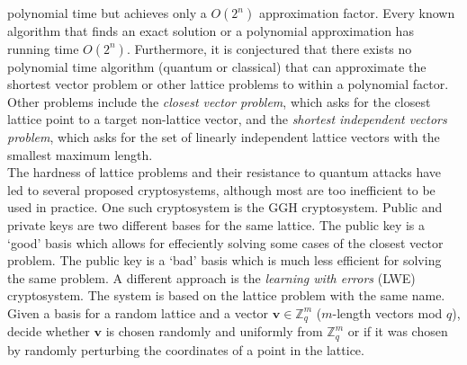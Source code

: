 \documentclass{article}
\renewcommand{\v}{\mathbf}
\begin{document}
polynomial time but achieves only a $O(2^n)$ approximation factor.
Every known algorithm that finds an exact solution or a polynomial approximation has running time $O(2^n)$. 
Furthermore, it is conjectured that there exists no polynomial time algorithm (quantum or classical) that can approximate the shortest vector problem
or other lattice problems to within a polynomial factor.
Other problems include the \textit{closest vector problem}, which asks for the closest lattice point to a target non-lattice vector,
and the \textit{shortest independent vectors problem}, which asks for the set of linearly independent lattice vectors with the smallest
maximum length.\footnotemark[\value{footnote}]\\

The hardness of lattice problems and their resistance to quantum attacks have led to several proposed cryptosystems, although most are
too inefficient to be used in practice. 
One such cryptosystem is the GGH cryptosystem. Public and private keys are two
different bases for the same lattice. The public key is a `good'
basis which allows for effeciently solving some cases
of the closest vector problem. The public key is a `bad' basis which
is much less efficient for solving the same problem. 
A different approach is the \textit{learning with errors} (LWE) cryptosystem.
The system is based on the lattice problem with the same name. 
Given a basis for a random lattice and a vector $\v{v} \in \mathbb{Z}^m_q$ ($m$-length vectors mod $q$), decide
whether $\v{v}$ is chosen randomly and uniformly from $\mathbb{Z}^m_q$ or if it was chosen by randomly perturbing the coordinates of
a point in the lattice.\footnotemark[\value{footnote}]
\end{document}
